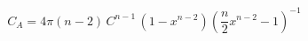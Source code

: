 \begin{equation}
C_{A}=4\pi(n-2) \,C^{n-1} \,(1-x^{n-2})\left(\frac{n}{2} x^{n-2}-1\right)^{-1}
\end{equation}

